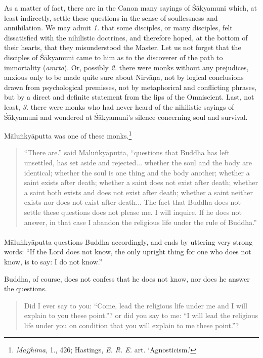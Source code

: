\documentclass[a4paper, 11pt, oneside, english]{article}
\begin{document}
As a matter of fact, there are in the Canon many sayings of Śākyamuni which, at least indirectly, settle these questions in the sense of soullessness and annihilation. We may admit \emph{1.} that some disciples, or many disciples, felt dissatisfied with the nihilistic doctrines, and therefore hoped, at the bottom of their hearts, that they misunderstood the Master. Let us not forget that the disciples of Śākyamuni came to him as to the discoverer of the path to immortality (\emph{amṛta}). Or, possibly \emph{2.} there were monks without any prejudices, anxious only to be made quite sure about Nirvāṇa, not by logical conclusions drawn from psychological premisses, not by metaphorical and conflicting phrases, but by a direct and definite statement from the lips of the Omniscient. Last, not least, \emph{3.} there were monks who had never heard of the nihilistic sayings of Śākyamuni and wondered at Śākyamuni's silence concerning soul and survival.

Māluṅkyāputta was one of these monks.\footnote{\emph{Majjhima}, 1., 426; Hastings, \emph{E. R. E.} art. `Agnosticism.'}
\begin{quotation}
\small
``There are.'' said Māluṅkyāputta, ``questions that Buddha has left unsettled, has set aside and rejected... whether the soul and the body are identical; whether the soul is one thing and the body another; whether a saint exists after death; whether a saint does not exist after death; whether a saint both exists and does not exist after death; whether a saint neither exists nor does not exist after death... The fact that Buddha does not settle these questions does not please me. I will inquire. If he does not answer, in that case I abandon the religious life under the rule of Buddha.''
\end{quotation}
\paragraph{}
Māluṅkyāputta questions Buddha accordingly, and ends by uttering very strong words: ``If the Lord does not know, the only upright thing for one who does not know, is to say: I do not know.''

Buddha, of course, does not confess that he does not know, nor does he answer the questions.
\begin{quotation}
\small
Did I ever say to you: ``Come, lead the religious life under me and I will explain to you these point.''? or did you say to me: ``I will lead the religious life under you on condition that you will explain to me these point.''?
\end{quotation}
\end{document}
